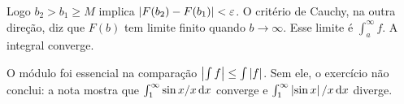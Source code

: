 \documentclass[11pt,a4paper]{article}
\begin{document}
Logo \(b_{2}>b_{1}\ge M\) implica \(\left\lvert F(b_{2})-F(b_{1}) \right\rvert<\varepsilon\). O critério de Cauchy, na outra direção, diz que \(F(b)\) tem limite finito quando \(b\to\infty\). Esse limite é \(\int_a^{\infty} f\). A integral converge.

O módulo foi essencial na comparação \(\left\lvert \int f \right\rvert\le\int\left\lvert f \right\rvert\). Sem ele, o exercício não conclui: a nota mostra que \(\int_1^{\infty}\sin x/x\,\mathrm{d} x\) converge e \(\int_1^{\infty}\left\lvert \sin x \right\rvert/x\,\mathrm{d} x\) diverge.
\end{document}
